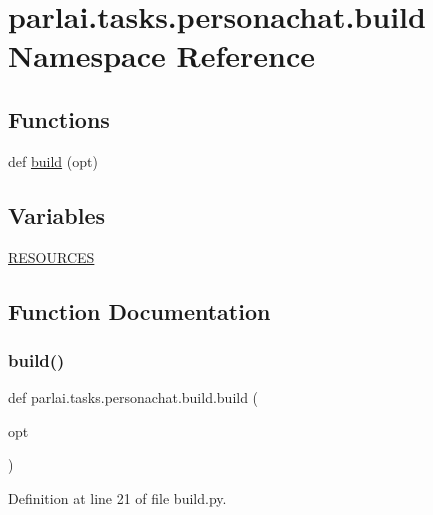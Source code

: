 \hypertarget{namespaceparlai_1_1tasks_1_1personachat_1_1build}{}\section{parlai.\+tasks.\+personachat.\+build Namespace Reference}
\label{namespaceparlai_1_1tasks_1_1personachat_1_1build}
\subsection*{Functions}
\begin{DoxyCompactItemize}
\item 
def \hyperlink{namespaceparlai_1_1tasks_1_1personachat_1_1build_a20041fc9bc8f146d3d5ddd944053807f}{build} (opt)
\end{DoxyCompactItemize}
\subsection*{Variables}
\begin{DoxyCompactItemize}
\item 
\hyperlink{namespaceparlai_1_1tasks_1_1personachat_1_1build_aae5953cb3f3d421372f4a7eea2b1dd69}{R\+E\+S\+O\+U\+R\+C\+ES}
\end{DoxyCompactItemize}


\subsection{Function Documentation}
\mbox{\label{namespaceparlai_1_1tasks_1_1personachat_1_1build_a20041fc9bc8f146d3d5ddd944053807f}} 
\subsubsection{\texorpdfstring{build()}{build()}}
{\footnotesize\ttfamily def parlai.\+tasks.\+personachat.\+build.\+build (\begin{DoxyParamCaption}\item[{}]{opt }\end{DoxyParamCaption})}



Definition at line 21 of file build.\+py.


